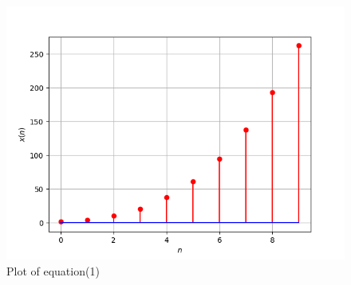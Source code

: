 \documentclass{article}
\begin{document}
\newpage
\begin{figure}
    \centering
    \includegraphics{figs/plot.png}
    \caption{Plot of equation(1)}
    \label{fig:plot}
\end{figure}
\end{document}
